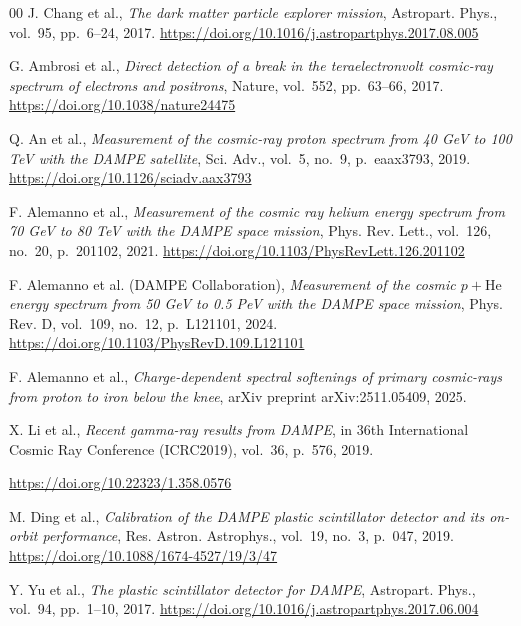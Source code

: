 \documentclass[preprint,12pt]{elsarticle}
\newcommand{\doi}[1]{\url{https://doi.org/#1}}
\begin{document}

\begin{thebibliography}{00}
  J. Chang et al.,
  \textit{The dark matter particle explorer mission},
  Astropart. Phys., vol.~95, pp.~6--24, 2017.
  \doi{10.1016/j.astropartphys.2017.08.005}

  G. Ambrosi et al.,
  \textit{Direct detection of a break in the teraelectronvolt cosmic-ray spectrum of electrons and positrons},
  Nature, vol.~552, pp.~63--66, 2017.
  \doi{10.1038/nature24475}

  Q. An et al.,
  \textit{Measurement of the cosmic-ray proton spectrum from 40 GeV to 100 TeV with the DAMPE satellite},
  Sci. Adv., vol.~5, no.~9, p.~eaax3793, 2019.
  \doi{10.1126/sciadv.aax3793}

  F. Alemanno et al.,
  \textit{Measurement of the cosmic ray helium energy spectrum from 70 GeV to 80 TeV with the DAMPE space mission},
  Phys. Rev. Lett., vol.~126, no.~20, p.~201102, 2021.
  \doi{10.1103/PhysRevLett.126.201102}

  F. Alemanno et al. (DAMPE Collaboration),
  \textit{Measurement of the cosmic $p+\mathrm{He}$ energy spectrum from 50 GeV to 0.5 PeV with the DAMPE space mission},
  Phys. Rev. D, vol.~109, no.~12, p.~L121101, 2024.
  \doi{10.1103/PhysRevD.109.L121101}

  F. Alemanno et al.,
  \textit{Charge-dependent spectral softenings of primary cosmic-rays from proton to iron below the knee},
  arXiv preprint arXiv:2511.05409, 2025.

  X. Li et al.,
  \textit{Recent gamma-ray results from DAMPE},
  in 36th International Cosmic Ray Conference (ICRC2019), vol.~36, p.~576, 2019.


  \doi{10.22323/1.358.0576}

  M. Ding et al.,
  \textit{Calibration of the DAMPE plastic scintillator detector and its on-orbit performance},
  Res. Astron. Astrophys., vol.~19, no.~3, p.~047, 2019.
  \doi{10.1088/1674-4527/19/3/47}

  Y. Yu et al.,
  \textit{The plastic scintillator detector for DAMPE},
  Astropart. Phys., vol.~94, pp.~1--10, 2017.
  \doi{10.1016/j.astropartphys.2017.06.004}


\end{thebibliography}
\end{document}
